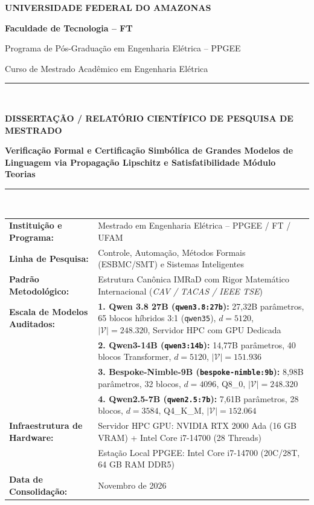 \documentclass[11pt,a4paper]{article}
\theoremstyle{definition}
\begin{document}
\begin{titlepage}
    \centering
    \vspace*{0.25cm}
    {\Huge\bfseries\color{ufamblue} UNIVERSIDADE FEDERAL DO AMAZONAS \par}
    \vspace{0.25cm}
    {\Large\bfseries Faculdade de Tecnologia -- FT \par}
    {\large Programa de Pós-Graduação em Engenharia Elétrica -- PPGEE \par}
    {\normalsize Curso de Mestrado Acadêmico em Engenharia Elétrica \par}
    \vspace{0.8cm}
    
    \rule{\linewidth}{1.5pt} \\[0.35cm]
    {\large\bfseries DISSERTAÇÃO / RELATÓRIO CIENTÍFICO DE PESQUISA DE MESTRADO \par}
    \vspace{0.25cm}
    {\LARGE\bfseries Verificação Formal e Certificação Simbólica de Grandes Modelos de Linguagem via Propagação Lipschitz e Satisfatibilidade Módulo Teorias \par}
    \rule{\linewidth}{1.5pt} \\[0.7cm]
    
    \begin{minipage}{0.98\textwidth}
        \small
        \begin{tabularx}{\linewidth}{l X}
            \textbf{Instituição e Programa:} & Mestrado em Engenharia Elétrica -- PPGEE / FT / UFAM \\
            \textbf{Linha de Pesquisa:} & Controle, Automação, Métodos Formais (ESBMC/SMT) e Sistemas Inteligentes \\
            \textbf{Padrão Metodológico:} & Estrutura Canônica IMRaD com Rigor Matemático Internacional (\textit{CAV / TACAS / IEEE TSE}) \\
            \textbf{Escala de Modelos Auditados:} & \textbf{1. Qwen 3.8 27B (\texttt{qwen3.8:27b}):} 27,32B parâmetros, 65 blocos híbridos 3:1 (\texttt{qwen35}), $d=5120$, $|\mathcal{V}|=248.320$, Servidor HPC com GPU Dedicada \\
            & \textbf{2. Qwen3-14B (\texttt{qwen3:14b}):} 14,77B parâmetros, 40 blocos Transformer, $d=5120$, $|\mathcal{V}|=151.936$ \\
            & \textbf{3. Bespoke-Nimble-9B (\texttt{bespoke-nimble:9b}):} 8,98B parâmetros, 32 blocos, $d=4096$, Q8\_0, $|\mathcal{V}|=248.320$ \\
            & \textbf{4. Qwen2.5-7B (\texttt{qwen2.5:7b}):} 7,61B parâmetros, 28 blocos, $d=3584$, Q4\_K\_M, $|\mathcal{V}|=152.064$ \\
            \textbf{Infraestrutura de Hardware:} & Servidor HPC GPU: NVIDIA RTX 2000 Ada (16 GB VRAM) + Intel Core i7-14700 (28 Threads) \\
            & Estação Local PPGEE: Intel Core i7-14700 (20C/28T, 64 GB RAM DDR5) \\
            \textbf{Data de Consolidação:} & Novembro de 2026
        \end{tabularx}
    \end{minipage}
    

\end{titlepage}
\end{document}

